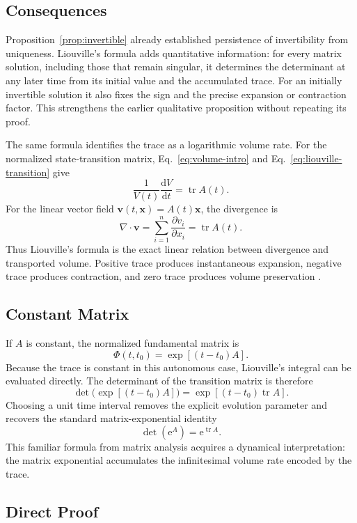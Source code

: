 \documentclass[11pt,a4paper]{article}
\newcommand{\be}{\begin{equation}}
\newcommand{\ee}{\end{equation}}
\newcommand{\lb}[1]{\label{#1}}
\newcommand{\e}{\mathrm{e}}
\newcommand{\dd}{\mathrm{d}}
\DeclareMathOperator{\tr}{tr}
\theoremstyle{definition}
\numberwithin{equation}{section}
\begin{document}
\subsection{Consequences}

Proposition~\ref{prop:invertible} already established persistence of invertibility from uniqueness. Liouville's formula adds quantitative information: for every matrix solution, including those that remain singular, it determines the determinant at any later time from its initial value and the accumulated trace. For an initially invertible solution it also fixes the sign and the precise expansion or contraction factor. This strengthens the earlier qualitative proposition without repeating its proof.

The same formula identifies the trace as a logarithmic volume rate. For the normalized state-transition matrix, Eq.~\eqref{eq:volume-intro} and Eq.~\eqref{eq:liouville-transition} give
\be
\frac{1}{V(t)}\frac{\dd V}{\dd t}
=
\tr A(t).
\lb{eq:relative-volume-rate}
\ee
For the linear vector field $\mathbf{v}(t,\mathbf{x})=A(t)\mathbf{x}$, the divergence is
\be
\nabla\cdot\mathbf{v}
=
\sum_{i=1}^{n}
\frac{\partial v_i}{\partial x_i}
=
\tr A(t).
\lb{eq:div-trace}
\ee
Thus Liouville's formula is the exact linear relation between divergence and transported volume. Positive trace produces instantaneous expansion, negative trace produces contraction, and zero trace produces volume preservation \cite{arnold1992,hirsch2013}.

\subsection{Constant Matrix}

If $A$ is constant, the normalized fundamental matrix is
\be
\Phi(t,t_0)=\exp[(t-t_0)A].
\lb{eq:matrix-exponential}
\ee
Because the trace is constant in this autonomous case, Liouville's integral can be evaluated directly. The determinant of the transition matrix is therefore
\be
\det\bigl(\exp[(t-t_0)A]\bigr)
=
\exp[(t-t_0)\tr A].
\lb{eq:det-exp}
\ee
Choosing a unit time interval removes the explicit evolution parameter and recovers the standard matrix-exponential identity
\be
\det(\e^A)=\e^{\tr A}.
\lb{eq:det-exp-one}
\ee
This familiar formula from matrix analysis acquires a dynamical interpretation: the matrix exponential accumulates the infinitesimal volume rate encoded by the trace.

\subsection{Direct Proof}
\end{document}
